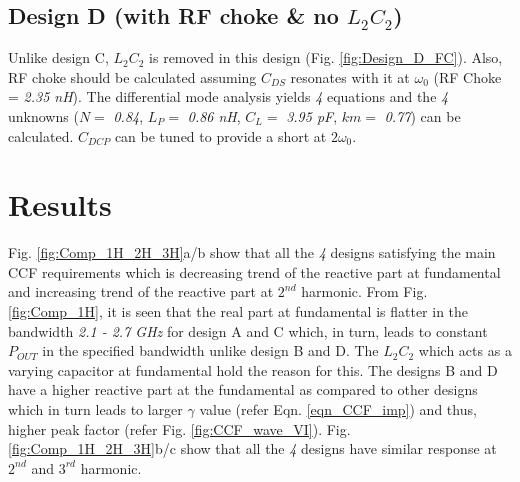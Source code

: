 \documentclass[conference]{IEEEtran}
\begin{document}
\subsection{Design D (with RF choke \& no $L_2C_2$)}
 Unlike design C, $L_2C_2$ is removed in this design (Fig. \ref{fig:Design_D_FC}). Also, RF choke should be calculated assuming $C_{DS}$ resonates with it at $\omega_0$ (RF Choke = \textit{2.35 nH}).
The differential mode analysis yields \textit{4} equations and the \textit{4} unknowns ($N =$ \textit{0.84}, $L_P =$ \textit{0.86 nH}, $C_L =$ \textit{3.95 pF}, $km =$ \textit{0.77}) can be calculated.
$C_{DCP}$ can be tuned to provide a short at $2\omega_0$.

\section{Results}
\label{section:Results}

Fig. \ref{fig:Comp_1H_2H_3H}a/b show that all the \textit{4} designs satisfying the main CCF requirements which is decreasing trend of the reactive part at fundamental and increasing trend of the reactive part at $2^{nd}$ harmonic.
From Fig. \ref{fig:Comp_1H}, it is seen that the real part at fundamental is flatter in the bandwidth \textit{2.1 - 2.7 GHz} for design A and C which, in turn, leads to constant $P_{OUT}$ in the specified bandwidth unlike design B and D. The $L_2C_2$ which acts as a varying capacitor at fundamental hold the reason for this. The designs B and D have a higher reactive part at the fundamental as compared to other designs which in turn leads to larger $\gamma$ value (refer Eqn. \ref{eqn_CCF_imp}) and thus, higher peak factor (refer Fig. \ref{fig:CCF_wave_VI}). Fig. \ref{fig:Comp_1H_2H_3H}b/c show that all the \textit{4} designs have similar response at $2^{nd}$ and $3^{rd}$ harmonic. 
\end{document}
